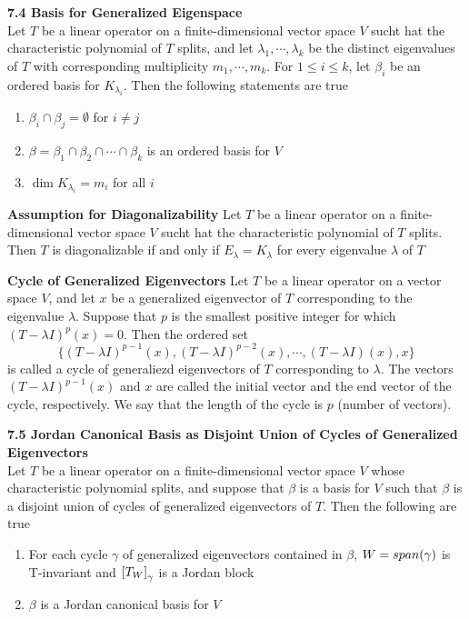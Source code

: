 \documentclass[11pt]{article}
\begin{document}
\begin{theorem*}
    \textbf{7.4 Basis for Generalized Eigenspace} \\
    Let $T$ be a linear operator on a finite-dimensional vector space $V$ sucht hat the characteristic polynomial of $T$ splits, and let $\lambda_1, \cdots, \lambda_k$ be the distinct eigenvalues of $T$ with corresponding multiplicity $m_1,\cdots, m_k$. For $1\leq i \leq k$, let $\beta_i$ be an ordered basis for $K_{\lambda_i}$. Then the following statements are true 
    \begin{enumerate}
        \item $\beta_i \cap \beta_j = \emptyset$ for $i\neq j$ 
        \item $\beta = \beta_1 \cap \beta_2 \cap \cdots \cap \beta_k$ is an ordered basis for $V$
        \item $\dim{K_{\lambda_i}} = m_i$ for all $i$
    \end{enumerate} 
\end{theorem*}

\begin{corollary*}
    \textbf{Assumption for Diagonalizability} Let $T$ be a linear operator on a finite-dimensional vector space $V$ sucht hat the characteristic polynomial of $T$ splits. Then $T$ is diagonalizable if and only if $E_{\lambda} = K_{\lambda}$ for every eigenvalue $\lambda$ of $T$
\end{corollary*}

\begin{defn*}
    \textbf{Cycle of Generalized Eigenvectors} Let $T$ be a linear operator on a vector space $V$, and let $x$ be a generalized eigenvector of $T$ corresponding to the eigenvalue $\lambda$. Suppose that $p$ is the smallest positive integer for which $(T-\lambda I)^p (x) = 0$. Then the ordered set 
    \[
        \{ (T-\lambda I)^{p-1}(x), (T-\lambda I)^{p-2}(x), \cdots, (T-\lambda I)(x), x \}
    \]
    is called a cycle of generaliezd eigenvectors of $T$  corresponding to $\lambda$. The vectors $(T-\lambda I)^{p-1}(x)$ and $x$ are called the initial vector and the end vector of the cycle, respectively. We say that the length of the cycle is $p$ (number of vectors).
\end{defn*}

\begin{theorem*}
    \textbf{7.5 Jordan Canonical Basis as Disjoint Union of Cycles of Generalized Eigenvectors} \\
    Let $T$ be a linear operator on a finite-dimensional vector space $V$ whose characteristic polynomial splits, and suppose that $\beta$ is a basis for $V$ such that $\beta$ is a disjoint union of cycles of generalized eigenvectors of $T$. Then the following are true 
    \begin{enumerate}
        \item For each cycle $\gamma$ of generalized eigenvectors contained in $\beta$, $W = span(\gamma)$ is T-invariant and $\left[ T_W \right]_{\gamma}$ is a Jordan block 
        \item $\beta$ is a Jordan canonical basis for $V$
    \end{enumerate}
\end{theorem*}
\end{document}
